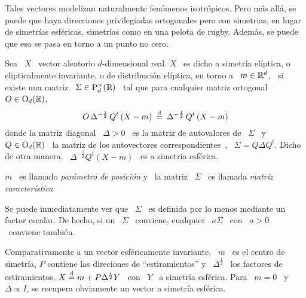 Tales  vectores  modelizan naturalmente  fen\'omenos  isotr\'opicos. Pero  m\'as
all\'a,  se  puede  que  haya  direcciones privilegiadas  ortogonales  pero  con
simetrias,  \ie en  lugar de  simetr\'ias esf\'ericas,  simetr\'ias como  en una
pelota de rugby. Adem\'as, se puede que eso se pasa en torno a un punto no cero.
%
\begin{definicion}
  Sea  \  $X$  \ vector  aleatorio  $d$-dimensional  real.   $X$  \ es  dicho  a
  simetr\'ia  el\'iptica,   o  elipticalmente  invariante,   o  de  distribuci\'on
  el\'iptica, en torno a \ $m \in  \mathbb{R}^d$, \ si existe una matriz \ $\Sigma \in
  \mathrm{P}_d^+(\mathbb{R})$ \ tal que para cualquier matriz ortogonal \ $O \in \mathrm{O}_d(\mathbb{R})$,
  \[
  O  \,   \Delta^{-\frac12}  \,  Q^t  \left(   X  -  m  \right)   \:  \stackrel{\mathrm{d}}{=}  \:
  \Delta^{-\frac12} \, Q^t \left( X - m \right)
  \]
  donde la  matriz diagonal \ $\Delta  > 0$ \ es  la matriz de  autovalores de \
  $\Sigma$  \  y  \  $Q  \in  \mathrm{O}_d(\mathbb{R})$  \  la  matriz  de  los  autovectores
  correspondientes~\cite{Bha97,   Bha07,  HorJoh13},  \   $\Sigma  =   Q  \Delta
  Q^t$. Dicho de  otra manera, \ $\Delta^{-\frac12} Q^t \left( X  - m \right)$ \
  es a simetr\'ia esf\'erica.

  $m$ \ es llamado {\em par\'ametro de posici\'on} y \ la matriz \ $\Sigma$ \ es
  llamada {\em matriz caracter\'istica}.
\end{definicion}
%
Se puede inmediatamente  ver que \ $\Sigma$ \ es definida  por lo menos mediante
un factor escalar. De hecho, si un \ $\Sigma$ \ conviene, cualquier \ $a \Sigma$
\ con \ $a > 0$ \ conviene tambi\'en.

Comparativamente a un  vector esf\'ericamente invariante, \ $m$ \  es el centro de
simetr\'ia,   $P$   contiene   las   direciones   de   ``estiramientos''   y   \
$\Delta^{\frac12}$  \   los  factores  de   estiramientos,  $X  \stackrel{\mathrm{d}}{=}  m   +  P
\Delta^{\frac12} Y$ \  con \ $Y$ \ a simetr\'ia  esf\'erica. Para \ $m =  0$ \ y \
$\Delta \propto I$, se recupera obviamente un vector a simetr\'ia esf\'erica.

